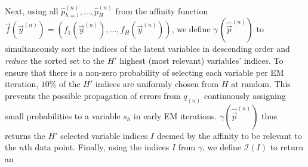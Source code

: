 %
Next, using all $\hat{p}_{h=1}^{(n)},\dots, \hat{p}_H^{(n)}$  
from the affinity function 
$\vec{f}(\vec{y}^{(n)}) = (f_1(\vec{y}^{(n)}), \dots, f_H(\vec{y}^{(n)}))$, we define 
 $\gamma\,(\hat{\vec{p}}^{(n)})$ to simultaneously sort the indices of the latent variables in descending order  and \textit{reduce} the sorted set to the $H'$ highest (most relevant) variables' indices. %
To ensure that there is a non-zero probability of selecting each variable per EM iteration, $10\%$ of the $H'$ indices are uniformly chosen from $H$ at random. 
This prevents the possible propagation of errors from $q_{(n)}$ continuously assigning small probabilities to a variable $s_h$ in early EM
iterations. 
%
%
$\gamma(\hat{\vec{p}}^{(n)})$ thus returns the $H'$ selected variable indices $I$ deemed by the affinity to be relevant to the $n$th data point.
%
%
%
Finally, using the indices $I$ from $\gamma$, we define $\mathcal{I}(I)$ to return an 
